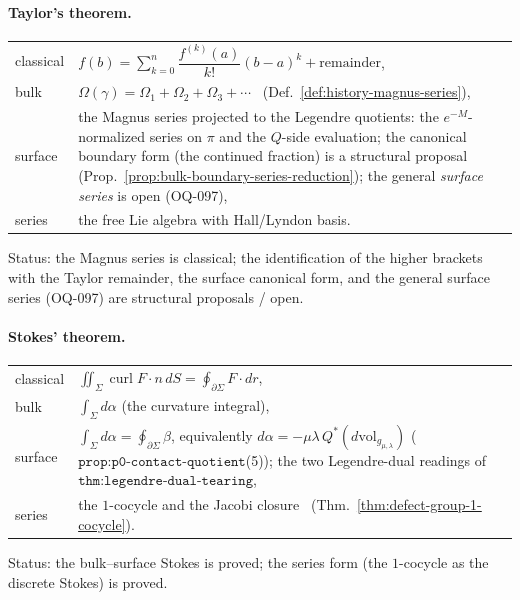 \paragraph{Taylor's theorem.} \hfill
\begin{center}
\begin{tabular}{lp{}}
classical & $f(b)=\sum_{k=0}^{n}\dfrac{f^{(k)}(a)}{k!}(b-a)^k+\text{remainder}$,\\[2pt]
bulk & $\Omega(\gamma)=\Omega_1+\Omega_2+\Omega_3+\cdots$
  \ (Def.~\ref{def:history-magnus-series}),\\[2pt]
surface & the Magnus series projected to the Legendre quotients: the
  $e^{-M}$-normalized series on $\pi$ and the $Q$-side evaluation; the canonical
  boundary form (the continued fraction) is a structural proposal
  (Prop.~\ref{prop:bulk-boundary-series-reduction}); the general
  \emph{surface series} is open (OQ-097),\\[2pt]
series & the free Lie algebra with Hall/Lyndon basis.
\end{tabular}
\end{center}
{\small Status: the Magnus series is classical; the identification of the
higher brackets with the Taylor remainder, the surface canonical form, and the
general surface series (OQ-097) are structural proposals / open.}

\paragraph{Stokes' theorem.} \hfill
\begin{center}
\begin{tabular}{lp{}}
classical & $\iint_\Sigma \operatorname{curl}F\cdot n\,dS=\oint_{\partial\Sigma}F\cdot dr$,\\[2pt]
bulk & $\int_\Sigma d\alpha$ (the curvature integral),\\[2pt]
surface & $\int_\Sigma d\alpha=\oint_{\partial\Sigma}\beta$, equivalently
  $d\alpha=-\mu\lambda\,Q^*(d\mathrm{vol}_{g_{\mu,\lambda}})$
  ($\texttt{prop:p0-contact-quotient}$(5)); the two Legendre-dual readings of
  $\texttt{thm:legendre-dual-tearing}$,\\[2pt]
series & the $1$-cocycle and the Jacobi closure
  \ (Thm.~\ref{thm:defect-group-1-cocycle}).
\end{tabular}
\end{center}
{\small Status: the bulk--surface Stokes is proved; the series form (the
$1$-cocycle as the discrete Stokes) is proved.}

